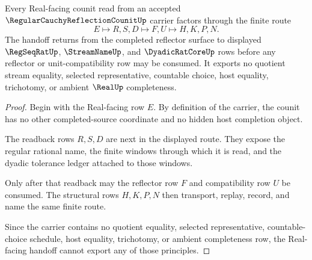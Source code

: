 \begin{theorem}
\label{thm:regular-cauchy-reflection-counit-real-handoff}
Every Real-facing counit read from an accepted $\RegularCauchyReflectionCounitUp$ carrier factors through the finite route
$$
E \longmapsto R,S,D \longmapsto F,U \longmapsto H,K,P,N .
$$
The handoff returns from the completed reflector surface to displayed $\RegSeqRatUp$, $\StreamNameUp$, and $\DyadicRatCoreUp$ rows before any reflector or unit-compatibility row may be consumed. It exports no quotient stream equality, selected representative, countable choice, host equality, trichotomy, or ambient $\RealUp$ completeness.
\end{theorem}
\begin{proof}
Begin with the Real-facing row $E$. By definition of the carrier, the counit has no other completed-source coordinate and no hidden host completion object.

The readback rows $R,S,D$ are next in the displayed route. They expose the regular rational name, the finite windows through which it is read, and the dyadic tolerance ledger attached to those windows.

Only after that readback may the reflector row $F$ and compatibility row $U$ be consumed. The structural rows $H,K,P,N$ then transport, replay, record, and name the same finite route.

Since the carrier contains no quotient equality, selected representative, countable-choice schedule, host equality, trichotomy, or ambient completeness row, the Real-facing handoff cannot export any of those principles.
\end{proof}


\begin{closurestatus}{\RegularCauchyReflectionCounitUp}
  \theoryclosure{\seedClosure}
  \formalstatus{\unformalizedV}
\end{closurestatus}
